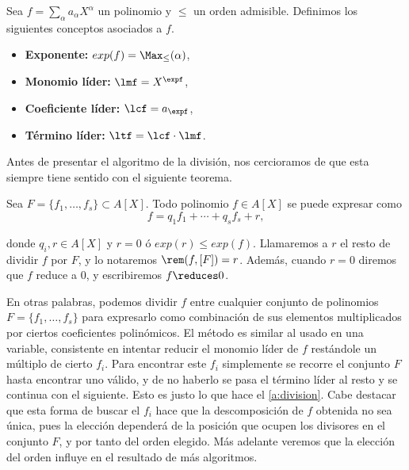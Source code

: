 \begin{definicion}
    Sea $f= \sum_{\alpha} a_{\alpha} X^{\alpha}$ un polinomio y $\le$ un orden admisible. Definimos los siguientes conceptos asociados a $f$.
    \begin{itemize}
        \item \textbf{Exponente:} $exp(f) = \Max_{\le}(\alpha)$,
        \item \textbf{Monomio líder:}  $\lmf = X^{\expf}$,
        \item \textbf{Coeficiente líder:} $\lcf = a_{\expf}$,
        \item \textbf{Término líder:} $\ltf = \lcf \cdot \lmf$.
    \end{itemize}
\end{definicion}

Antes de presentar el algoritmo de la división, nos cercioramos de que esta siempre tiene sentido con el siguiente teorema.
\begin{teorema}
    Sea $F=\{f_1,\dots, f_s\} \subset A[X]$. Todo polinomio $f\in A[X]$ se puede expresar como
    \begin{equation*}
        f = q_1f_1 + \cdots + q_sf_s + r,
    \end{equation*}

    donde $q_i, r\in A[X]$ y $r=0$ ó $exp(r)\le exp(f)$. Llamaremos a $r$ el resto de dividir $f$ por $F$, y lo notaremos $\rem(f, [F]) = r$. Además, cuando $r=0$ diremos que $f$ reduce a $0$, y escribiremos $f \reduces 0$.
\end{teorema}

En otras palabras, podemos dividir $f$ entre cualquier conjunto de polinomios $F=\{f_1, \dots, f_s\}$ para expresarlo como combinación de sus elementos multiplicados por ciertos coeficientes polinómicos. El método es similar al usado en una variable, consistente en intentar reducir el monomio líder de $f$ restándole un múltiplo de cierto $f_i$. Para encontrar este $f_i$ simplemente se recorre el conjunto $F$ hasta encontrar uno válido, y de no haberlo se pasa el término líder al resto y se continua con el siguiente. Esto es justo lo que hace el \autoref{a:division}. Cabe destacar que esta forma de buscar el $f_i$ hace que la descomposición de $f$ obtenida no sea única, pues la elección dependerá de la posición que ocupen los divisores en el conjunto $F$, y por tanto del orden elegido. Más adelante veremos que la elección del orden influye en el resultado de más algoritmos.

